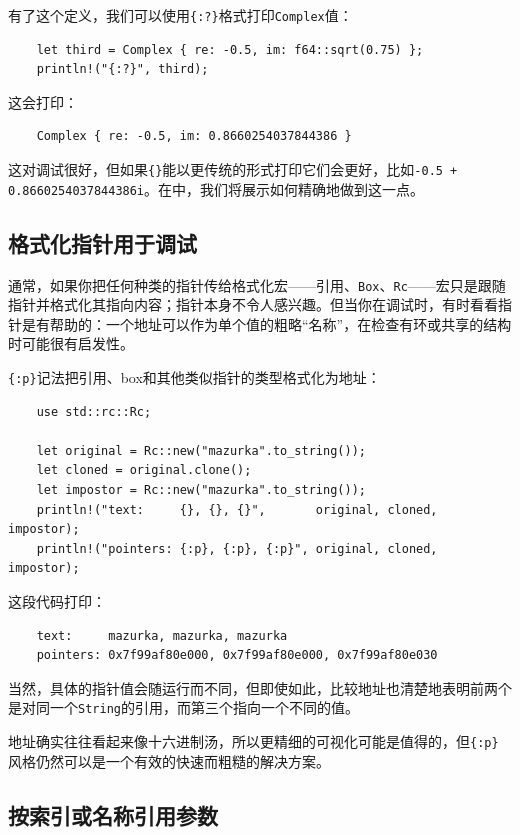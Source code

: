 有了这个定义，我们可以使用\texttt{\{:?\}}格式打印\texttt{Complex}值：
\begin{verbatim}
    let third = Complex { re: -0.5, im: f64::sqrt(0.75) };
    println!("{:?}", third);
\end{verbatim}

这会打印：
\begin{verbatim}
    Complex { re: -0.5, im: 0.8660254037844386 }
\end{verbatim}

这对调试很好，但如果\texttt{\{\}}能以更传统的形式打印它们会更好，比如\texttt{-0.5 + 0.8660254037844386i}。在中，我们将展示如何精确地做到这一点。

\subsection{格式化指针用于调试}

通常，如果你把任何种类的指针传给格式化宏——引用、\texttt{Box}、\texttt{Rc}——宏只是跟随指针并格式化其指向内容；指针本身不令人感兴趣。但当你在调试时，有时看看指针是有帮助的：一个地址可以作为单个值的粗略“名称”，在检查有环或共享的结构时可能很有启发性。

\texttt{\{:p\}}记法把引用、box和其他类似指针的类型格式化为地址：
\begin{verbatim}
    use std::rc::Rc;

    let original = Rc::new("mazurka".to_string());
    let cloned = original.clone();
    let impostor = Rc::new("mazurka".to_string());
    println!("text:     {}, {}, {}",       original, cloned, impostor);
    println!("pointers: {:p}, {:p}, {:p}", original, cloned, impostor);
\end{verbatim}

这段代码打印：
\begin{verbatim}
    text:     mazurka, mazurka, mazurka
    pointers: 0x7f99af80e000, 0x7f99af80e000, 0x7f99af80e030
\end{verbatim}

当然，具体的指针值会随运行而不同，但即使如此，比较地址也清楚地表明前两个是对同一个\texttt{String}的引用，而第三个指向一个不同的值。

地址确实往往看起来像十六进制汤，所以更精细的可视化可能是值得的，但\texttt{\{:p\}}风格仍然可以是一个有效的快速而粗糙的解决方案。

\subsection{按索引或名称引用参数}

